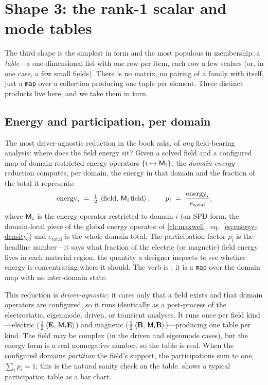 \section{Shape 3: the rank-1 scalar and mode tables}
\label{sec:tables}

The third shape is the simplest in form and the most populous in membership: a
\emph{table}---a one-dimensional list with one row per item, each row a few
scalars (or, in one case, a few small fields). There is no matrix, no pairing of
a family with itself, just a \texttt{map} over a collection producing one tuple
per element. Three distinct products live here, and we take them in turn.

\subsection{Energy and participation, per domain}
\label{sec:energy-table}

The most driver-agnostic reduction in the book asks, of \emph{any} field-bearing
analysis: where does the field energy sit? Given a solved field and a configured
map of domain-restricted energy operators $\{i\mapsto \mathsf{M}_i\}$, the
\emph{domain-energy} reduction computes, per domain, the energy in that domain
and the fraction of the total it represents:
\begin{equation}
  \mathrm{energy}_i \;=\; \tfrac12\,\left\langle \text{field},\, \mathsf{M}_i\,\text{field}\right\rangle,
  \qquad
  p_i \;=\; \frac{\mathrm{energy}_i}{e_{\text{total}}},
  \label{eq:energy-part}
\end{equation}
where $\mathsf{M}_i$ is the energy operator restricted to domain $i$ (an SPD form,
the domain-local piece of the global energy operator of \cref{ch:maxwell},
eq.~\eqref{eq:energy-density}) and $e_{\text{total}}$ is the whole-domain total.
The participation factor $p_i$ is the headline number---it says what fraction of
the electric (or magnetic) field energy lives in each material region, the
quantity a designer inspects to see whether energy is concentrating where it
should. The verb is ; it is a \texttt{map} over the
domain map with no inter-domain state.

This reduction is \emph{driver-agnostic}: it cares only that a field exists and
that domain operators are configured, so it runs identically as a post-process of
the electrostatic, eigenmode, driven, or transient analyses. It runs once per
field kind---electric ($\tfrac12\left\langle \mathbf{E},\, \mathsf{M}_i\mathbf{E}\right\rangle$) and magnetic
($\tfrac12\left\langle \mathbf{B},\, \mathsf{M}_i\mathbf{B}\right\rangle$)---producing one table per kind. The field
may be complex (in the driven and eigenmode cases), but the energy form is a real
nonnegative number, so the table is real. When the configured domains
\emph{partition} the field's support, the participations sum to one,
$\sum_i p_i = 1$; this is the natural sanity check on the table.
 shows a typical participation table as a bar chart.

